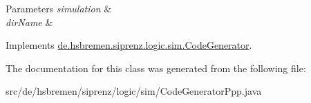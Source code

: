 \begin{DoxyParams}{Parameters}
{\em simulation} & \\
\hline
{\em dir\+Name} & \\
\hline
\end{DoxyParams}


Implements \hyperlink{interfacede_1_1hsbremen_1_1siprenz_1_1logic_1_1sim_1_1CodeGenerator_a2c30cae9f4f91ca44fa8c7f27aabbdc0}{de.\+hsbremen.\+siprenz.\+logic.\+sim.\+Code\+Generator}.



The documentation for this class was generated from the following file\+:\begin{DoxyCompactItemize}
\item 
src/de/hsbremen/siprenz/logic/sim/Code\+Generator\+Ppp.\+java\end{DoxyCompactItemize}
